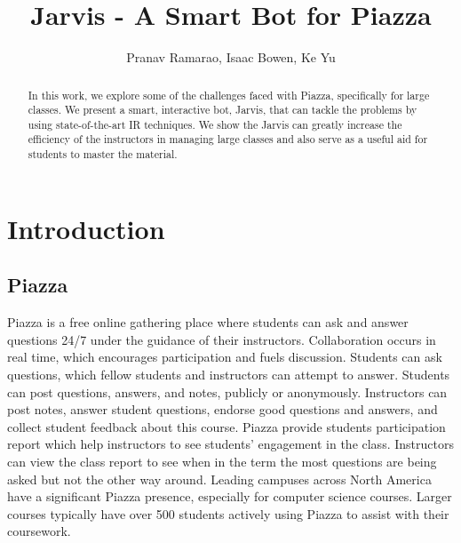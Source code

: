 \documentclass[sigconf]{acmart}
\begin{document}
\title{Jarvis - A Smart Bot for Piazza}
\author{Pranav Ramarao, Isaac Bowen, Ke Yu}


\renewcommand{\shortauthors}{Ramarao, Bowen, Yu}


\begin{abstract}
In this work, we explore some of the challenges faced with Piazza, specifically for large classes. We present a smart, interactive bot, Jarvis, that can tackle the problems by using state-of-the-art IR techniques. We show the Jarvis can greatly increase the efficiency of the instructors in managing large classes and also serve as a useful aid for students to master the material.
\end{abstract}


\maketitle
\section{Introduction}

\subsection{Piazza}
Piazza is a free online gathering place where students can ask and answer questions 24/7 under the guidance of their instructors. Collaboration occurs in real time, which encourages participation and fuels discussion. Students can ask questions, which fellow students and instructors can attempt to answer. Students can post questions, answers, and notes, publicly or anonymously. Instructors can post notes, answer student questions, endorse good questions and answers, and collect student feedback about this course. Piazza provide students participation report which help instructors to see students’ engagement in the class. Instructors can view the class report to see when in the term the most questions are being asked but not the other way around. Leading campuses across North America have a significant Piazza presence, especially for computer science courses. Larger courses typically have over 500 students actively using Piazza to assist with their coursework.
\end{document}
